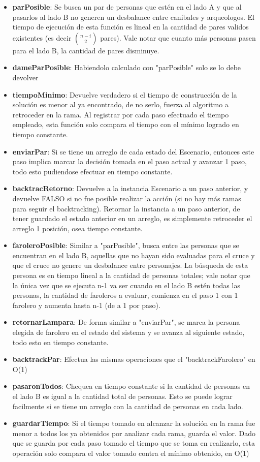 \begin{itemize}
\item {\bf parPosible}: Se busca un par de personas que est\'en en el lado A y que al pasarlos al lado B no generen un desbalance entre canibales y arqueologos. El tiempo de ejecución de esta función es lineal en la cantidad de pares validos existentes (es decir $\binom {n-i}{2}$ pares). Vale notar que cuanto más personas pasen para el lado B, la cantidad de pares disminuye.
\item {\bf dameParPosible}: Habiendolo calculado con "parPosible" solo se lo debe devolver
\item {\bf tiempoMinimo}: Devuelve verdadero si el tiempo de construcci\'on de la soluci\'on es menor al ya encontrado, de no serlo, fuerza al algoritmo a retroceder en la rama. Al registrar por cada paso efectuado el tiempo empleado, esta función solo compara el tiempo con el m\'inimo logrado en tiempo constante.
\item {\bf enviarPar}: Si se tiene un arreglo de cada estado del Escenario, entonces este paso implica marcar la decisión tomada en el paso actual y avanzar 1 paso, todo esto pudiendose efectuar en tiempo constante.
\item {\bf backtracRetorno}: Devuelve a la instancia Escenario a un paso anterior, y devuelve FALSO si no fue posible realizar la acción (si no hay más ramas para seguir el backtracking). Retornar la instancia a un paso anterior, de tener guardado el estado anterior en un arreglo, es simplemente retroceder el arreglo 1 posición, osea tiempo constante.
\item {\bf faroleroPosible}: Similar a "parPosible", busca entre las personas que se encuentran en el lado B, aquellas que no hayan sido evaluadas para el cruce y que el cruce no genere un desbalance entre personajes. La búsqueda de esta persona es en tiempo lineal a la  cantidad de personas totales; vale notar que la única vez que se ejecuta n-1 va ser cuando en el lado B estén todas las personas, la cantidad de faroleros a evaluar, comienza en el paso 1 con 1 farolero y aumenta hasta n-1 (de a 1 por paso).
\item {\bf retornarLampara}: De forma similar a "enviarPar", se marca la persona elegida de farolero en el estado del sistema y se avanza al siguiente estado, todo esto en tiempo constante.
\item {\bf backtrackPar}: Efectua las mismas operaciones que el "backtrackFarolero" en O(1)
\item {\bf pasaronTodos}: Chequea en tiempo constante si la cantidad de personas en el lado B es igual a la cantidad total de personas. Esto se puede lograr facilmente si se tiene un arreglo con la cantidad de personas en cada lado.
\item {\bf guardarTiempo}: Si el tiempo tomado en alcanzar la soluci\'on en la rama fue menor a todos los ya obtenidos por analizar cada rama, guarda el valor. Dado que se guarda por cada paso tomado el tiempo que se toma en realizarlo, esta operaci\'on solo compara el valor tomado contra el m\'inimo obtenido, en O(1)
\end{itemize}  
